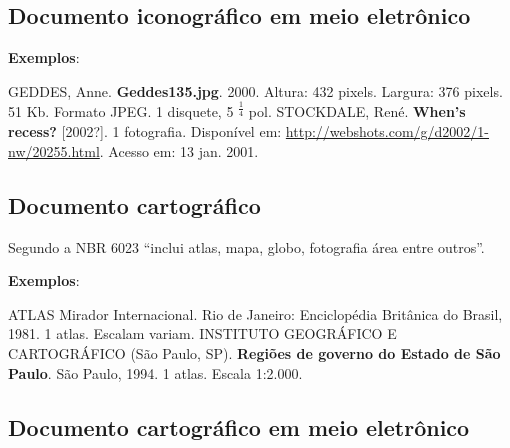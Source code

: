 \subsection{Documento iconográfico em meio eletrônico}

\begin{exemplomanual}
\textbf{Exemplos}:\\
\begin{singlespace}
GEDDES, Anne. \textbf{Geddes135.jpg}. 2000. Altura: 432 pixels. Largura: 376 pixels. 51 Kb. Formato JPEG. 1 disquete, 5 \textsuperscript{$\frac{1}{4}$} pol.
\newline
\newline
STOCKDALE, René. \textbf{When’s recess?} [2002?]. 1 fotografia. Disponível em: \url{http://webshots.com/g/d2002/1-nw/20255.html}. Acesso em: 13 jan. 2001.
\end{singlespace}
\end{exemplomanual}


\subsection{Documento cartográfico}

Segundo a NBR 6023 \cite[p.12]{NBR6023:2002} ``inclui atlas, mapa, globo, fotografia área entre outros''.

\begin{flushleft}
\begin{singlespace}
\end{singlespace}
\end{flushleft}

\begin{exemplomanual}
\textbf{Exemplos}:\\
\begin{singlespace}
ATLAS Mirador Internacional. Rio de Janeiro: Enciclopédia Britânica do Brasil, 1981. 1 atlas. Escalam variam.
\newline
\newline
INSTITUTO GEOGRÁFICO E CARTOGRÁFICO (São Paulo, SP). \textbf{Regiões de governo do Estado de São Paulo}. São Paulo, 1994. 1 atlas. Escala 1:2.000.
\end{singlespace}
\end{exemplomanual}


\subsection{Documento cartográfico em meio eletrônico}

